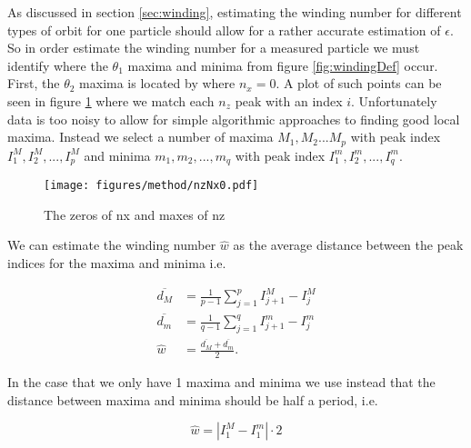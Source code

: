 \label{sec:windingEstimation}
As discussed in section \ref{sec:winding}, estimating the winding number for different types of orbit for one particle 
should allow for a rather accurate estimation of $\epsilon$. So in order estimate the winding number for a measured 
particle we must identify where the $\theta_1$ maxima and minima from figure \ref{fig:windingDef} occur. First, the 
$\theta_2$ maxima is located by where $n_x = 0$. A plot of such 
points can be seen in figure \ref{fig:nzNx0} where we match each $n_z$ peak with an index $i$. Unfortunately data is 
too noisy to allow for simple algorithmic approaches 
to finding good local maxima. Instead we select a number of maxima $M_1, M_2 ... M_p$ with peak index $I^M_1, I^M_2, 
..., I^M_p$  and minima $m_1, m_2, ..., m_q$ with peak index $I^m_1, I^m_2, ..., I^m_q$.

\begin{figure}
\centering
\texttt{[image: figures/method/nzNx0.pdf]}
\caption{The zeros of nx and maxes of nz}
\label{fig:nzNx0}
\end{figure}

We can estimate the winding number $\hat{w}$ as the average distance between the peak indices for the maxima and minima 
i.e. 

\begin{align}
\overline{d_M} &= \frac{1}{p-1} \sum\limits_{j=1}^{p} I^M_{j+1} - I^M_{j} \\
\overline{d_m} &= \frac{1}{q-1} \sum\limits_{j=1}^{q} I^m_{j+1}- I^m_{j}\\
\hat{w}   &= \frac{\overline{d_M} + \overline{d_m}}{2}.
\label{eq:winding2}
\end{align}


In the case that we only have 1 maxima and minima we use instead that the distance between maxima and minima should be 
half a period, i.e.

\begin{equation}
\hat{w} = \left| I^M_1 - I^m_1 \right| \cdot 2
\end{equation}